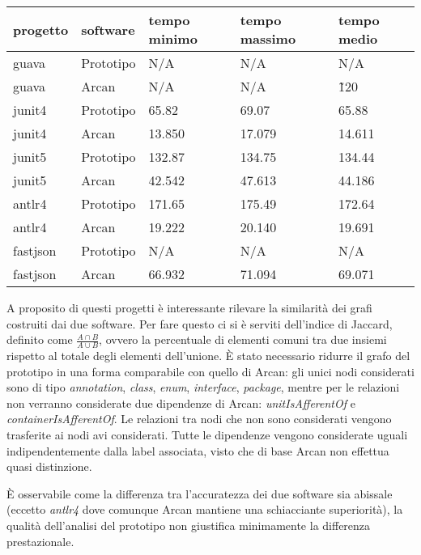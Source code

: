 \begin{center}
    \begin{tabular}{|l|l|l|l|l|}
        \hline
        progetto & software & tempo minimo & tempo massimo & tempo medio \\ \hline
        \hline
        \rowcolor[HTML]{ED8796}
        guava    & Prototipo & N/A    & N/A    & N/A    \\ \hline
        \rowcolor[HTML]{A6DA95} 
        guava    & Arcan     & N/A    & N/A    & \~120   \\ \hline
        \rowcolor[HTML]{EED49F} 
        junit4   & Prototipo & 65.82  & 69.07  & 65.88  \\ \hline
        \rowcolor[HTML]{A6DA95} 
        junit4   & Arcan     & 13.850 & 17.079 & 14.611 \\ \hline
        \rowcolor[HTML]{EED49F} 
        junit5   & Prototipo & 132.87 & 134.75 & 134.44 \\ \hline
        \rowcolor[HTML]{A6DA95} 
        junit5   & Arcan     & 42.542 & 47.613 & 44.186 \\ \hline
        \rowcolor[HTML]{EED49F} 
        antlr4   & Prototipo & 171.65 & 175.49 & 172.64 \\ \hline
        \rowcolor[HTML]{A6DA95} 
        antlr4   & Arcan     & 19.222 & 20.140 & 19.691 \\ \hline
        \rowcolor[HTML]{ED8796} 
        fastjson & Prototipo & N/A    & N/A    & N/A    \\ \hline
        \rowcolor[HTML]{A6DA95} 
        fastjson & Arcan     & 66.932 & 71.094 & 69.071 \\ \hline
    \end{tabular}
\end{center}

\begin{sloppypar}
A proposito di questi progetti \`e interessante rilevare la similarit\`a dei grafi costruiti dai due software. Per fare questo ci si \`e serviti dell'indice di Jaccard, definito come $\frac {A \cap B} {A \cup B}$, ovvero la percentuale di elementi comuni tra due insiemi rispetto al totale degli elementi dell'unione. \`E stato necessario ridurre il grafo del prototipo in una forma comparabile con quello di Arcan: gli unici nodi considerati sono di tipo \emph{annotation}, \emph{class}, \emph{enum}, \emph{interface}, \emph{package}, mentre per le relazioni non verranno considerate due dipendenze di Arcan: \emph{unitIsAfferentOf} e \emph{containerIsAfferentOf}. Le relazioni tra nodi che non sono considerati vengono trasferite ai nodi avi considerati. Tutte le dipendenze vengono considerate uguali indipendentemente dalla label associata, visto che di base Arcan non effettua quasi distinzione.
\end{sloppypar}
\`E osservabile come la differenza tra l'accuratezza dei due software sia abissale (eccetto \emph{antlr4} dove comunque Arcan mantiene una schiacciante superiorit\`a), la qualit\`a dell'analisi del prototipo non giustifica minimamente la differenza prestazionale.

